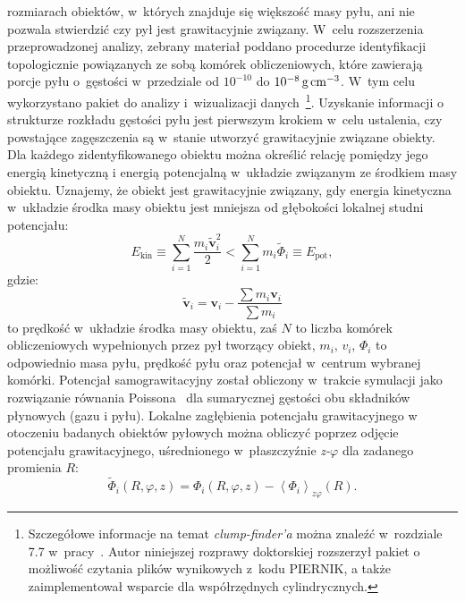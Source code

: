 rozmiarach obiektów, w~których znajduje się większość masy pyłu, ani nie pozwala
stwierdzić czy pył jest grawitacyjnie związany. W~celu rozszerzenia
przeprowadzonej analizy, zebrany materiał poddano procedurze identyfikacji
topologicznie powiązanych ze sobą komórek obliczeniowych, które zawierają porcje
pyłu o~gęstości w~przedziale od $10^{-10}$ do $10^{-8}\hbox{$\thinspace\textrm{g}$}\hbox{$\thinspace\textrm{cm}$}^{-3}$. W~tym celu
wykorzystano pakiet do analizy i~wizualizacji danych~\yt{}\footnote{Szczegółowe
informacje na temat \emph{clump-finder'a} można znaleźć w~rozdziale 7.7
w~pracy~\cite{yt}. Autor niniejszej rozprawy doktorskiej rozszerzył pakiet
\yt{} o możliwość czytania plików wynikowych z~kodu \textsc{PIERNIK}, a także
zaimplementował wsparcie dla współrzędnych cylindrycznych.}.  Uzyskanie
informacji o strukturze rozkładu gęstości pyłu jest pierwszym krokiem w~celu
ustalenia, czy powstające zagęszczenia są w~stanie utworzyć grawitacyjnie
związane obiekty. Dla każdego zidentyfikowanego obiektu można określić relację
pomiędzy jego energią kinetyczną i energią potencjalną w~układzie związanym ze
środkiem masy obiektu. Uznajemy, że obiekt jest grawitacyjnie związany, gdy
energia kinetyczna w~układzie środka masy obiektu jest mniejsza od głębokości
lokalnej studni potencjału:
%
\begin{equation}
   \label{eq:bcrit}
   E_{\textrm{kin}} \equiv \sum\limits_{i=1}^N \frac{m_i\tilde{\mathbf{v}}_i^2}{2} 
   < \sum\limits_{i=1}^N m_i\tilde{\Phi}_i \equiv E_{\textrm{pot}},
\end{equation}
%
gdzie:
\begin{equation}
   \tilde{\mathbf{v}}_i = \mathbf{v}_i - \frac{\sum m_i \mathbf{v}_i}{\sum m_i}
   \label{eq:velcom}
\end{equation}
to prędkość w~układzie środka masy obiektu, zaś $N$ to liczba komórek
obliczeniowych wypełnionych przez pył tworzący obiekt, $m_i$, $v_i$, $\Phi_i$ to
odpowiednio masa pyłu, prędkość pyłu oraz potencjał w~centrum wybranej komórki. Potencjał
samograwitacyjny został obliczony w~trakcie symulacji jako rozwiązanie
równania Poissona~ dla sumarycznej gęstości obu składników
płynowych (gazu i pyłu).  Lokalne zagłębienia potencjału grawitacyjnego w
otoczeniu badanych obiektów pyłowych można obliczyć poprzez odjęcie potencjału
grawitacyjnego, uśrednionego w~płaszczyźnie \emph{z-$\varphi$} dla zadanego
promienia $R$:
%
\begin{equation}
   \tilde{\Phi}_i(R,\varphi,z) = \Phi_i(R,\varphi,z) -
   \left<\Phi_i\right>_{z\varphi}(R).
\end{equation}
%
